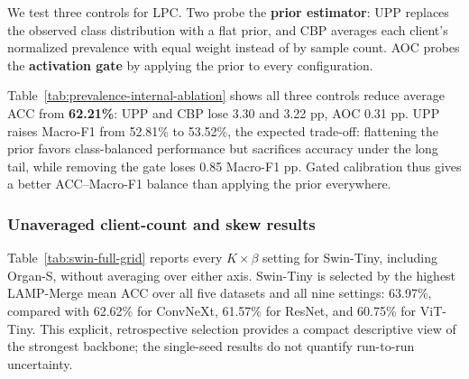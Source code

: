 \documentclass[journal,twoside,web]{ieeecolor}
\begin{document}


We test three controls for LPC. Two probe the \textbf{prior estimator}: UPP replaces the observed class distribution with a flat prior, and CBP averages each client's normalized prevalence with equal weight instead of by sample count. AOC probes the \textbf{activation gate} by applying the prior to every configuration.

Table~\ref{tab:prevalence-internal-ablation} shows all three controls reduce average ACC from \textbf{62.21\%}: UPP and CBP lose 3.30 and 3.22 pp, AOC 0.31 pp. UPP raises Macro-F1 from 52.81\% to 53.52\%, the expected trade-off: flattening the prior favors class-balanced performance but sacrifices accuracy under the long tail, while removing the gate loses 0.85 Macro-F1 pp. Gated calibration thus gives a better ACC--Macro-F1 balance than applying the prior everywhere.

\subsubsection{Unaveraged client-count and skew results}
Table~\ref{tab:swin-full-grid} reports every $K\times\beta$ setting for Swin-Tiny, including Organ-S, without averaging over either axis. Swin-Tiny is selected by the highest LAMP-Merge mean ACC over all five datasets and all nine settings: 63.97\%, compared with 62.62\% for ConvNeXt, 61.57\% for ResNet, and 60.75\% for ViT-Tiny. This explicit, retrospective selection provides a compact descriptive view of the strongest backbone; the single-seed results do not quantify run-to-run uncertainty.

\end{document}
